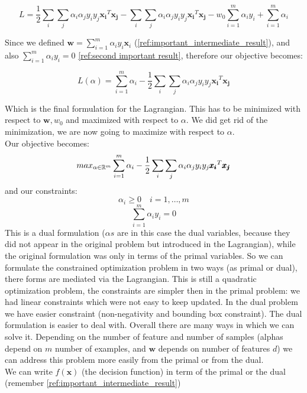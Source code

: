             $$L = \frac{1}{2} \sum_{i} \sum_{j} \alpha_i \alpha_j y_i y_j \pmb{x_i} ^T \pmb{x_j}  - 
                \sum_{i} \sum_{j} \alpha_i \alpha_j y_i y_j \pmb{x_i} ^T \pmb{x_j} - 
                w_0 \sum_{i=1}^m \alpha_i y_i + \sum_{i=1}^m \alpha_i$$

            Since we defined $\pmb{w} =  \sum_{i=1}^m \alpha_i y_i \pmb{x}_i$ (\ref{ref:important_intermediate_result}), and also $\sum_{i=1}^m \alpha_i y_i = 0$ \ref{ref:second important result}, therefore our objective becomes:

            $$L(\alpha) =  \sum_{i=1}^m \alpha_i - 
                \frac{1}{2} \sum_{i} \sum_{j} \alpha_i \alpha_j y_i y_j \pmb{x_i} ^T \pmb{x_j} $$

            Which is the final formulation for the Lagrangian. This has to be minimized with respect to $\pmb{w}, w_0$ and maximized with respect to $\alpha$. We did get rid of the minimization, we are now going to maximize with respect to $\alpha$.\\

            Our objective becomes:
            $$max_{\alpha \in \mathbb{R}^m}\sum_{i=1}^m \alpha_i - 
                \frac{1}{2} \sum_{i} \sum_{j} \alpha_i \alpha_j y_i y_j \pmb{x_i} ^T \pmb{x_j} $$
            and our constraints:
            $$\alpha_i \geq 0 \quad i = 1, \dots, m$$
            $$\sum_{i=1}^m \alpha_i y_i = 0$$
            This is a dual formulation ($\alpha s$ are in this case the dual variables, because they did not appear in the original problem but introduced in the Lagrangian), while the original formulation was only in terms of the primal variables. 
            So we can formulate the constrained optimization problem in two ways (as primal or dual), there forms are mediated via the Lagrangian.
            This is still a quadratic optimization problem, the constraints are simpler then in the primal problem: we had linear constraints which were not easy to keep updated.
            In the dual problem we have easier constraint (non-negativity and bounding box constraint).
            The dual formulation is easier to deal with. Overall there are many ways in which we can solve it.
            Depending on the number of feature and number of samples (alphas depend on $m$ number of examples, and $\pmb{w}$ depends on number of features $d$) we can address this problem more easily from the primal or from the dual. \\

            We can write $f(\pmb{x})$ (the decision function) in term of the primal or the dual (remember \ref{ref:important_intermediate_result})
            
